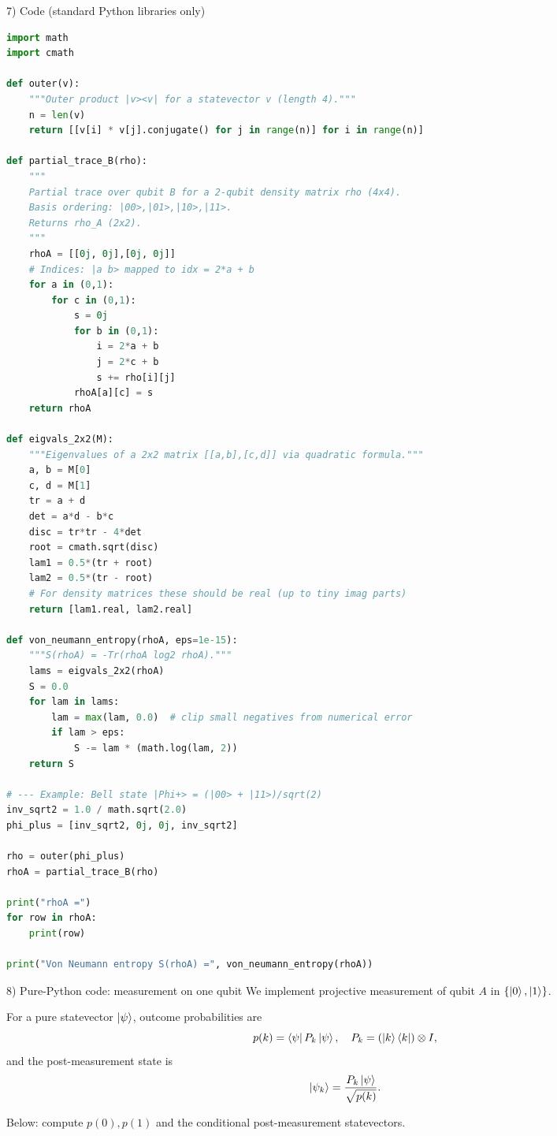 \documentclass[aspectratio=169]{beamer}
\begin{document}
\begin{frame}[fragile]{7) Code (standard Python libraries only)}
\begin{lstlisting}[language=Python]
import math
import cmath

def outer(v):
    """Outer product |v><v| for a statevector v (length 4)."""
    n = len(v)
    return [[v[i] * v[j].conjugate() for j in range(n)] for i in range(n)]

def partial_trace_B(rho):
    """
    Partial trace over qubit B for a 2-qubit density matrix rho (4x4).
    Basis ordering: |00>,|01>,|10>,|11>.
    Returns rho_A (2x2).
    """
    rhoA = [[0j, 0j],[0j, 0j]]
    # Indices: |a b> mapped to idx = 2*a + b
    for a in (0,1):
        for c in (0,1):
            s = 0j
            for b in (0,1):
                i = 2*a + b
                j = 2*c + b
                s += rho[i][j]
            rhoA[a][c] = s
    return rhoA

def eigvals_2x2(M):
    """Eigenvalues of a 2x2 matrix [[a,b],[c,d]] via quadratic formula."""
    a, b = M[0]
    c, d = M[1]
    tr = a + d
    det = a*d - b*c
    disc = tr*tr - 4*det
    root = cmath.sqrt(disc)
    lam1 = 0.5*(tr + root)
    lam2 = 0.5*(tr - root)
    # For density matrices these should be real (up to tiny imag parts)
    return [lam1.real, lam2.real]

def von_neumann_entropy(rhoA, eps=1e-15):
    """S(rhoA) = -Tr(rhoA log2 rhoA)."""
    lams = eigvals_2x2(rhoA)
    S = 0.0
    for lam in lams:
        lam = max(lam, 0.0)  # clip small negatives from numerical error
        if lam > eps:
            S -= lam * (math.log(lam, 2))
    return S

# --- Example: Bell state |Phi+> = (|00> + |11>)/sqrt(2)
inv_sqrt2 = 1.0 / math.sqrt(2.0)
phi_plus = [inv_sqrt2, 0j, 0j, inv_sqrt2]

rho = outer(phi_plus)
rhoA = partial_trace_B(rho)

print("rhoA =")
for row in rhoA:
    print(row)

print("Von Neumann entropy S(rhoA) =", von_neumann_entropy(rhoA))
\end{lstlisting}
\end{frame}

\begin{frame}{8) Pure-Python code: measurement on one qubit}
We implement projective measurement of qubit $A$ in $\{\ket{0},\ket{1}\}$.

\medskip
For a pure statevector $\ket{\psi}$, outcome probabilities are
\[
p(k)=\bra{\psi}P_k\ket{\psi},\quad P_k=(\ket{k}\bra{k})\otimes I,
\]
and the post-measurement state is
\[
\ket{\psi_k}=\frac{P_k\ket{\psi}}{\sqrt{p(k)}}.
\]

\medskip
Below: compute $p(0),p(1)$ and the conditional post-measurement statevectors.
\end{frame}
\end{document}
